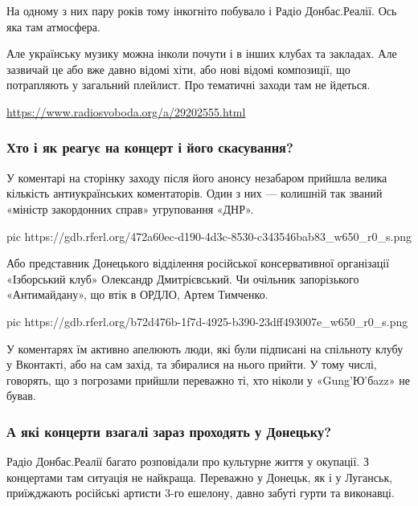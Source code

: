 На одному з них пару років тому інкогніто побувало і Радіо Донбас.Реалії.
Ось яка там атмосфера.

Але українську музику можна інколи почути і в інших клубах та закладах.
Але зазвичай це або вже давно відомі хіти, або нові відомі композиції, що
потрапляють у загальний плейлист. Про тематичні заходи там не йдеться.

\url{https://www.radiosvoboda.org/a/29202555.html}

\subsubsection{Хто і як реагує на концерт і його скасування?}

У коментарі на сторінку заходу після його анонсу незабаром прийшла велика
кількість антиукраїнських коментаторів. Один з них --- колишній так званий
«міністр закордонних справ» угруповання «ДНР».

\ifcmt
pic https://gdb.rferl.org/472a60ec-d190-4d3c-8530-c343546bab83_w650_r0_s.png
\fi

Або представник Донецького відділення російської консервативної організації
«Ізборський клуб» Олександр Дмитрієвський. Чи очільник запорізького
«Антимайдану», що втік в ОРДЛО, Артем Тимченко.

\ifcmt
pic https://gdb.rferl.org/b72d476b-1f7d-4925-b390-23dff493007e_w650_r0_s.png
\fi

У коментарях їм активно апелюють люди, які були підписані на спільноту клубу у
Вконтакті, або на сам захід, та збиралися на нього прийти. У тому числі,
говорять, що з погрозами прийшли переважно ті, хто ніколи у «Gung'Ю'бazz» не
бував.

\subsubsection{А які концерти взагалі зараз проходять у Донецьку?}

Радіо Донбас.Реалії багато розповідали про культурне життя у окупації. З
концертами там ситуація не найкраща. Переважно у Донецьк, як і у Луганськ,
приїжджають російські артисти 3-го ешелону, давно забуті гурти та
виконавці.


